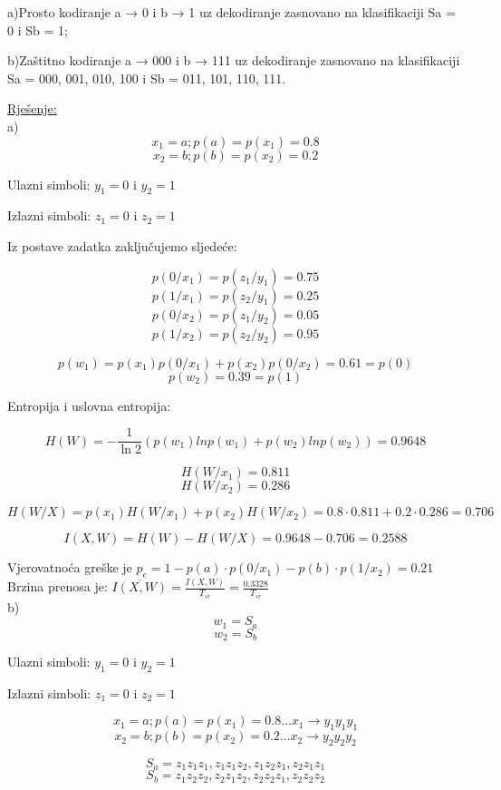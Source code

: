 \documentclass[12pt]{article}
\begin{document}
a)Prosto kodiranje a → 0 i b → 1 uz dekodiranje zasnovano na klasifikaciji Sa = {0} i Sb = {1};

b)Zaštitno kodiranje a → 000 i b → 111 uz dekodiranje zasnovano na klasifikaciji Sa = {000, 001, 010, 100} i Sb = {011, 101, 110, 111}.

\underline{Rješenje:}\\

a)\\

$$x_1 = a; p(a) = p(x_1) = 0.8$$
$$x_2 = b; p(b) = p(x_2) = 0.2$$

Ulazni simboli: $y_1 = 0$ i $y_2 = 1$

Izlazni simboli: $z_1 = 0$ i $z_2 = 1$

Iz postave zadatka zaključujemo sljedeće:

$$p(0/x_1) = p(z_1/y_1) = 0.75$$
$$p(1/x_1) = p(z_2/y_1) = 0.25$$
$$p(0/x_2) = p(z_1/y_2) = 0.05$$
$$p(1/x_2) = p(z_2/y_2) = 0.95$$

$$p(w_1) = p(x_1) p(0/x_1) + p(x_2) p(0/x_2) = 0.61 = p(0)$$
$$p(w_2) = 0.39 = p(1)$$

Entropija i uslovna entropija:

$$H(W) = - \frac{1}{\ln{2}} ( p(w_1) ln p(w_1) + p(w_2) ln p(w_2) ) = 0.9648$$

$$H(W/x_1) = 0.811$$
$$H(W/x_2) = 0.286$$

$$H(W/X) = p(x_1) H(W/x_1) + p(x_2) H(W / x_2) = 0.8 \cdot 0.811 + 0.2 \cdot 0.286 = 0.706$$ 

$$I(X, W) = H(W) - H(W / X) = 0.9648 - 0.706 = 0.2588$$

Vjerovatnoća greške je $p_e = 1 - p(a) \cdot p(0 / x_1) - p(b) \cdot p(1 / x_2) = 0.21$\\

Brzina prenosa je: $\overline{I(X, W)} = \frac{I(X, W)}{T_{sr}} = \frac{0.3328}{T_{sr}}$\\

\newpage
b)\\

$$w_1 = S_a$$
$$w_2 = S_b$$

Ulazni simboli: $y_1 = 0$ i $y_2 = 1$

Izlazni simboli: $z_1 = 0$ i $z_2 = 1$

$$x_1 = a; p(a) = p(x_1) = 0.8...x_1 \to y_1y_1y_1$$
$$x_2 = b; p(b) = p(x_2) = 0.2...x_2 \to y_2y_2y_2$$

$$S_a = {z_1z_1z_1, z_1z_1z_2, z_1z_2z_1, z_2z_1z_1}$$
$$S_b = {z_1z_2z_2, z_2z_1z_2, z_2z_2z_1, z_2z_2z_2}$$
\end{document}
